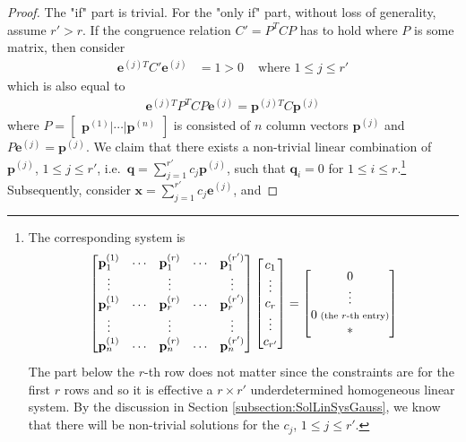 \begin{proof}
The "if" part is trivial. For the "only if" part, without loss of generality, assume $r' > r$. If the congruence relation $C' = P^TCP$ has to hold where $P$ is some matrix, then consider
\begin{align*}
\textbf{e}^{(j)T}C'\textbf{e}^{(j)} &= 1 > 0 & \text{ where $1 \leq j \leq r'$}
\end{align*}
which is also equal to 
\begin{align*}
\textbf{e}^{(j)T}P^TCP\textbf{e}^{(j)} = \textbf{p}^{(j)T}C\textbf{p}^{(j)}
\end{align*}
where $P = \begin{bmatrix}
\textbf{p}^{(1)} | \cdots | \textbf{p}^{(n)}    
\end{bmatrix}$ is consisted of $n$ column vectors $\textbf{p}^{(j)}$ and $P\textbf{e}^{(j)} = \textbf{p}^{(j)}$. We claim that there exists a non-trivial linear combination of $\textbf{p}^{(j)}$, $1 \leq j \leq r'$, i.e.\ $\textbf{q} = \sum_{j=1}^{r'} c_j\textbf{p}^{(j)}$, such that $\textbf{q}_i = 0$ for $1 \leq i \leq r$.\footnote{The corresponding system is
\begin{align*}
\begin{bmatrix}
\textbf{p}_1^{(1)} & \cdots &\textbf{p}_1^{(r)} & \cdots & \textbf{p}_1^{(r')} \\
\vdots & & \vdots & & \vdots \\
\textbf{p}_r^{(1)} & \cdots & \textbf{p}_r^{(r)} & \cdots & \textbf{p}_r^{(r')} \\
\vdots & & \vdots & & \vdots \\
\textbf{p}_n^{(1)} & \cdots & \textbf{p}_n^{(r)} & \cdots & \textbf{p}_n^{(r')}
\end{bmatrix}
\begin{bmatrix}
c_1 \\
\vdots \\
c_r \\
\vdots \\
c_{r'}
\end{bmatrix} = 
\begin{bmatrix}
0 \\
\vdots \\
0 {\scriptsize \text{ (the $r$-th entry)}}\\
* 
\end{bmatrix}
\end{align*}
The part below the $r$-th row does not matter since the constraints are for the first $r$ rows and so it is effective a $r \times r'$ underdetermined homogeneous linear system. By the discussion in Section \ref{subsection:SolLinSysGauss}, we know that there will be non-trivial solutions for the $c_j$, $1 \leq j \leq r'$.} Subsequently, consider $\textbf{x} = \sum_{j=1}^{r'} c_j \textbf{e}^{(j)}$, and

\end{proof}
